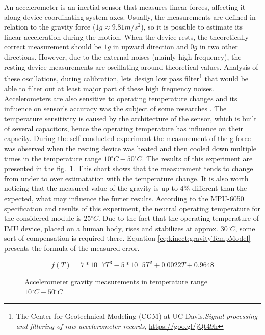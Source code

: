 \documentclass[sensors,article,submit,moreauthors,pdftex,10pt,a4paper]{mdpi}
\newcommand{\degree}{\ensuremath{{}^{\circ}}\xspace}
\begin{document}
	An accelerometer is an inertial sensor that measures linear forces, affecting it along device coordinating system axes. Usually, the measurements are defined in relation to the gravity force ($1g \approx 9.81  m/{s^2}$), so it is possible to estimate its linear acceleration during the motion. When the device rests, the theoretically correct measurement should be $1g$ in upward direction and $0g$ in two other directions. However, due to the external noises (mainly high frequency), the resting device measurements are oscillating around theoretical values. Analysis of these oscillations, during calibration, lets design low pass filter\footnote{The Center for Geotechnical Modeling (CGM) at UC Davis,\textit{Signal processing and filtering of raw accelerometer records}, \url{https://goo.gl/jQt49h}}\cite{Wang2011} that would be able to filter out at least major part of these high frequency noises. Accelerometers are also sensitive to operating temperature changes and its influence on sensor’s accuracy was the subject of some researches \cite{Schneider2006, Grigorie1996}. The temperature sensitivity is caused by the architecture of the sensor, which is built of several capacitors, hence the operating temperature has influence on their capacity. During the self conducted experiment the measurement of the g-force was observed when the resting device was heated and then cooled down multiple times in the temperature range $10\degree C - 50\degree C$. The results of this experiment are presented in the fig.~\ref{fig:imu:tmep}. This chart shows that the measurement tends to change from under to over estimatation with the temperature change. It is also worth noticing that the measured value of the gravity is up to $4\%$ different than the expected, what may influence the furter results. According to the MPU-6050 specification and results of this experiment, the neutral operating temperature for the considered module is $25\degree C$. Due to the fact that the operating temperature of IMU device, placed on a human body, rises and stabilizes at approx. $30 \degree C$, some sort of compensation is required there. Equation \ref{eq:kinect:gravityTempModel} presents the formula of the measured error.
	
	\begin{equation}
		f(T) = 7*10^-7 T^3 - 5*10^-5 T^2 + 0.0022T + 0.9648
		\label{eq:kinect:gravityTempModel}
	\end{equation}
	
	\begin{figure}[H]
		\centering
			
		\caption{Accelerometer gravity measurements in temperature range $10\degree C - 50\degree C$}
		\label{fig:imu:tmep}
	\end{figure}
	
\end{document}
